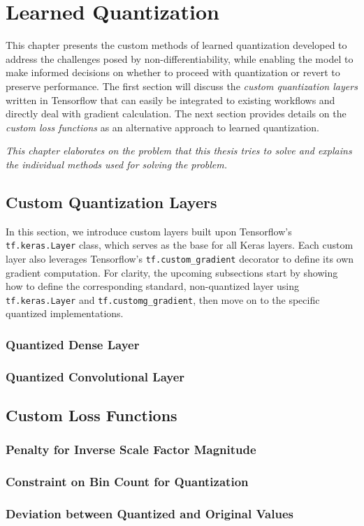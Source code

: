 \chapter{Learned Quantization\label{cha:chapter3}}
This chapter presents the custom methods of learned quantization developed to address the challenges posed by non-differentiability, 
while enabling the model to make informed decisions on whether to proceed with quantization or revert to preserve performance.
The first section will discuss the \textit{custom quantization layers} written in Tensorflow that can easily be
integrated to existing workflows and directly deal with gradient calculation. The next section provides details on the \textit{custom loss functions} as 
an alternative approach to learned quantization.

\textit{This chapter elaborates on the problem that this thesis tries to solve and explains the individual methods used for solving the problem. }

\section{Custom Quantization Layers}
\label{sec:customlayer}
In this section, we introduce custom layers built upon Tensorflow's \texttt{tf.keras.Layer} class, 
which serves as the base for all Keras layers. Each custom layer also leverages Tensorflow's 
\texttt{tf.custom\_gradient} decorator to define its own gradient computation.
For clarity, the upcoming subsections start by showing how to define the corresponding standard, 
non-quantized layer using \texttt{tf.keras.Layer} and \texttt{tf.customg\_gradient},
then move on to the specific quantized implementations.

\subsection{Quantized Dense Layer}
\label{subsec:quantizeddense}

\subsection{Quantized Convolutional Layer}
\label{subsec:quantizedconvolutional}

\section{Custom Loss Functions}
\label{sec:customloss}

\subsection{Penalty for Inverse Scale Factor Magnitude} 
\label{subsec:scaleinverse}

\subsection{Constraint on Bin Count for Quantization}
\label{subsec:maxbin}

\subsection{Deviation between Quantized and Original Values}
\label{subsec:difference}